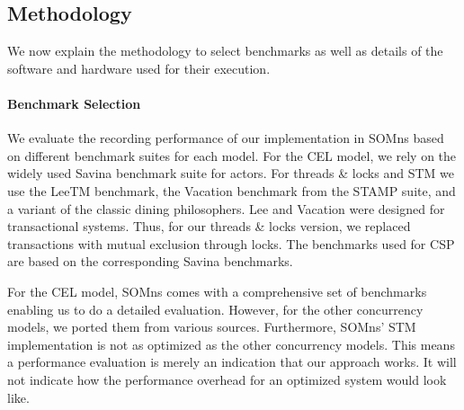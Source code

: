 \documentclass[a4paper,UKenglish,cleveref,autoref]{lipics-v2019}
\newcommand{\citep}[1]{\,\cite{#1}}
\def\SOMns{SOM{\sc ns}\xspace}
\begin{document}
\subsection{Methodology}


We now explain the methodology to select benchmarks as well as details of the software and hardware used for their execution.

\paragraph*{Benchmark Selection}

We evaluate the recording performance of our implementation in \SOMns based on different benchmark suites for each model.
For the CEL model,
we rely on the widely used Savina benchmark suite
for actors.
%
For threads \& locks and STM
we use the LeeTM benchmark,
the Vacation benchmark from the STAMP suite,
and a variant of the classic dining philosophers.
%
Lee and Vacation were designed for
transactional systems.
Thus, for our threads \& locks version,
we replaced transactions
with mutual exclusion through locks.
%
The benchmarks used for CSP
are based on the
corresponding Savina benchmarks.


For the CEL model, \SOMns comes with a comprehensive set of benchmarks
enabling us to do a detailed evaluation.
However, for the other concurrency models,
we ported them from various sources.
Furthermore, \SOMns' STM implementation is not as optimized as the other concurrency models.
This means a performance evaluation is merely an indication
that our approach works.
It will not indicate how the performance overhead for an optimized system would look like.
\end{document}
